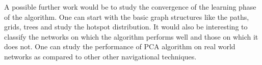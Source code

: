 \documentclass[10pt, conference, compsocconf]{IEEEtran}
\begin{document}
A possible further work would be to study the convergence of the learning phase of the algorithm. One can start with the basic graph structures like the paths, grids, trees and study the hotspot distribution. It would also be interesting to classify the networks on which the algorithm performs well and those on which it does not. One can study the performance of PCA algorithm on real world networks as compared to other other navigational techniques.\\

%
%



%
%
\end{document}
